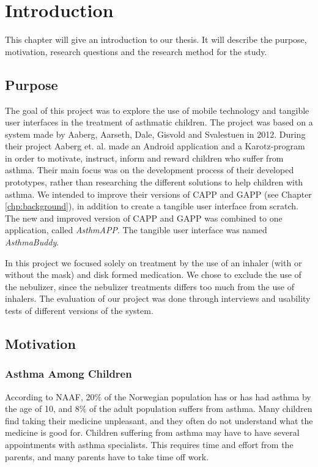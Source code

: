 \chapter{Introduction}
\label{chp:introduction}

This chapter will give an introduction to our thesis. It will describe the purpose, motivation, research questions and the research method for the study. 

\section{Purpose}
\label{sec:purpose}
The goal of this project was to explore the use of mobile technology and tangible user interfaces in the treatment of asthmatic children. The project was based on a system made by Aaberg, Aarseth, Dale, Gisvold and Svalestuen in 2012\cite{CustomerDriven}. During their project Aaberg et. al. made an Android application and a Karotz-program in order to motivate, instruct, inform and reward children who suffer from asthma. Their main focus was on the development process of their developed prototypes, rather than researching the different solutions to help children with asthma.
We intended to improve their versions of CAPP and GAPP (see Chapter \ref{chp:background}), in addition to create a tangible user interface from scratch. The new and improved version of CAPP and GAPP was combined to one application, called \emph{AsthmAPP}. The tangible user interface was named \emph{AsthmaBuddy}. 

In this project we focused solely on treatment by the use of an inhaler (with or without the mask) and disk formed medication. We chose to exclude the use of the nebulizer, since the nebulizer treatments differs too much from the use of inhalers.
The evaluation of our project was done through interviews and usability tests of different versions of the system. 
 

\section{Motivation}
\label{sec:motivation}

\subsection{Asthma Among Children}
According to NAAF, 20\% of the Norwegian population has or has had asthma by the age of 10, and 8\% of the adult population suffers from asthma\cite{NAAFStat}. Many children find taking their medicine unpleasant, and they often do not understand what the medicine is good for. Children suffering from asthma may have to have several appointments with  asthma specialists. This requires time and effort from the parents, and many parents have to take time off work. 

